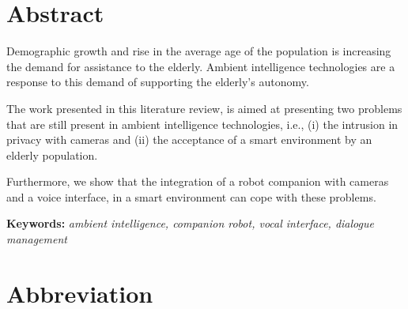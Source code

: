 \documentclass{thesisreport}
\begin{document}
  
 
\section*{Abstract}
Demographic growth and rise in the average age of the population is increasing the demand for assistance to the elderly.
Ambient intelligence technologies are a response to this demand of supporting the elderly's autonomy.

The work presented in this literature review, is aimed at presenting two problems that are still present in ambient intelligence technologies, i.e., (i) the intrusion in privacy with cameras and (ii) the acceptance of a smart environment by an elderly population.

Furthermore, we show that the integration of a robot companion with cameras and a voice interface, in a smart environment can cope with these problems.

\quad \textbf{Keywords:} \textit{ambient intelligence, companion robot, vocal interface, dialogue management}

 \newpage
 
 
 \section*{Abbreviation}
 
\end{document}
